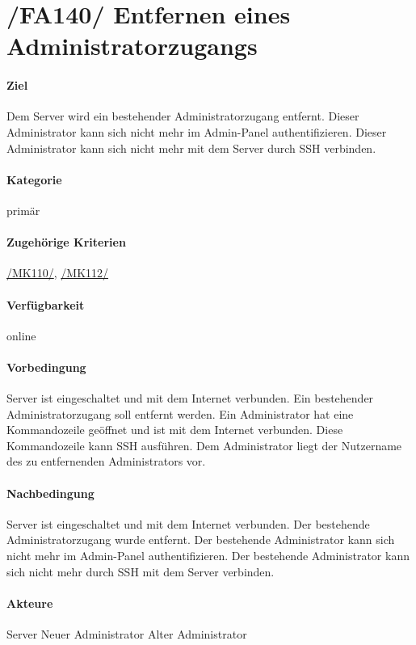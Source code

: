 \section[Entfernen eines Administratorzugangs]{/FA140/ Entfernen eines Administratorzugangs}
\label{/FA140/}
\paragraph{Ziel}
Dem \Gls{Server} wird ein bestehender \Gls{Administrator}zugang entfernt.
Dieser Administrator kann sich nicht mehr im \Gls{Admin-Panel} authentifizieren.
Dieser Administrator kann sich nicht mehr mit dem \Gls{Server} durch \Gls{SSH} verbinden.
\paragraph{Kategorie}
primär
\paragraph{Zugehörige Kriterien}
\hyperref[/MK110/]{/MK110/}, \hyperref[/MK112/]{/MK112/}
\paragraph{Verfügbarkeit}
online
\paragraph{Vorbedingung}
\Gls{Server} ist eingeschaltet und mit dem Internet verbunden.
Ein bestehender \Gls{Administrator}zugang soll entfernt werden.
Ein \Gls{Administrator} hat eine \Gls{Kommandozeile} geöffnet und ist mit dem Internet verbunden.
Diese \Gls{Kommandozeile} kann \Gls{SSH} ausführen.
Dem \Gls{Administrator} liegt der Nutzername des zu entfernenden \Gls{Administrator}s vor.
\paragraph{Nachbedingung}
\Gls{Server} ist eingeschaltet und mit dem Internet verbunden.
Der bestehende \Gls{Administrator}zugang wurde entfernt.
Der bestehende \Gls{Administrator} kann sich nicht mehr im \Gls{Admin-Panel} authentifizieren.
Der bestehende \Gls{Administrator} kann sich nicht mehr durch \Gls{SSH} mit dem Server verbinden.
\paragraph{Akteure}
\Gls{Server}
Neuer \Gls{Administrator}
Alter \Gls{Administrator}
